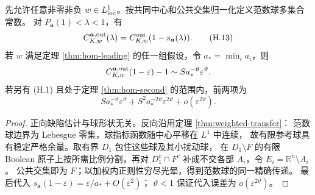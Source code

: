 \begin{corollary}[不等指数共同中心外层回传]\label{cor:hom-multilinear}
先允许任意非零非负 $w\in L^1_{\rm loc}$。按共同中心和公共交集归一化定义范数球多集合常数。
对 $P_{\boldsymbol a}(1)<\lambda<1$，有
\[C^{\boldsymbol a,\rm out}_{K,w}(\lambda)
=C^{\rm out}_{K,w}(1-s_{\boldsymbol a}(\lambda)).\tag{H.13}\]
若 $w$ 满足定理 \ref{thm:hom-leading} 的任一组假设，令 $a_*=\min_i a_i$，则
\[
 C^{\boldsymbol a,\rm out}_{K,w}(1-\varepsilon)-1
 \sim S a_*^{-\vartheta}\varepsilon^\vartheta.
\]
若另有 (H.1) 且处于定理 \ref{thm:hom-second} 的范围内，前两项为
\[
 S a_*^{-\vartheta}\varepsilon^\vartheta+
 S^2a_*^{-2\vartheta}\varepsilon^{2\vartheta}+o(\varepsilon^{2\vartheta}).
\]
\end{corollary}
\begin{proof}
正向缺陷估计与球形状无关。反向沿用定理 \ref{thm:weighted-transfer}：
范数球边界为 Lebesgue 零集，球指标函数随中心平移在 $L^1$ 中连续，
故有限参考球具有稳定严格余量。取有界 $D_1$ 包住这些球及其小扰动球，
在 $D_1\setminus F$ 的有限 Boolean 原子上按所需比例分割，再对
$D_1^c\cap F^c$ 补成不交各部 $A_i$，令 $E_i=\mathbb R^n\setminus A_i$。
公共交集即为 $F$；以加权内正则性穷尽光晕，得到范数球的同一精确传递。
最后代入 $s_{\boldsymbol a}(1-\varepsilon)=\varepsilon/a_*+O(\varepsilon^2)$；
$\vartheta<1$ 保证代入误差为 $o(\varepsilon^{2\vartheta})$。
\end{proof}
